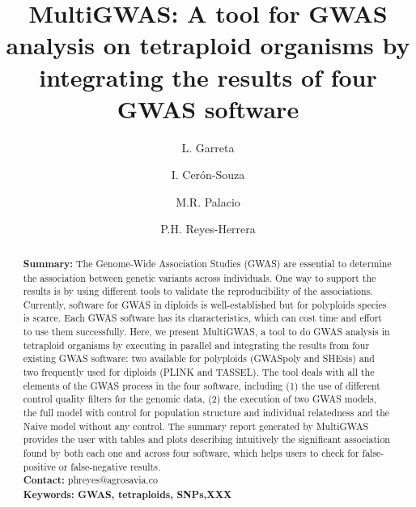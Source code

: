 \documentclass{article}
\begin{document}
\title{MultiGWAS: A tool for GWAS analysis on tetraploid organisms by integrating the results of four GWAS software}

\author[1]{L. Garreta}

\author[1]{I. Cer\'{o}n-Souza}
\author[2]{M.R. Palacio}
\author[1]{P.H. Reyes-Herrera}




\maketitle

\begin{abstract}
\textbf{Summary:} The Genome-Wide Association Studies (GWAS) are essential to determine the association between genetic variants across individuals. One way to support the results is by using different tools to validate the reproducibility of the associations. Currently, software for GWAS in diploids is well-established but for polyploids species is scarce. Each GWAS software has its characteristics, which can cost time and effort to use them successfully. Here, we present MultiGWAS, a tool to do GWAS analysis in tetraploid organisms by executing in parallel and integrating the results from four existing GWAS software: two available for polyploids (GWASpoly and SHEsis) and two frequently used for diploids (PLINK and TASSEL). The tool deals with all the elements of the GWAS process in the four software, including (1) the use of different control quality filters for the genomic data, (2) the execution of two GWAS models, the full model with control for population structure and individual relatedness and the Naive model without any control. The summary report generated by MultiGWAS provides the user with tables and plots describing intuitively the significant association found by both each one and across four software, which helps users to check for false-positive or false-negative results.\\
\textbf{Contact:} phreyes@agrosavia.co\\

\textbf{Keywords: GWAS, tetraploids, SNPs,XXX}

\end{abstract}
\maketitle 
\end{document}
